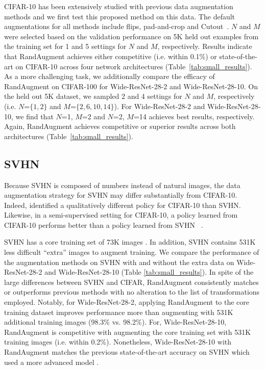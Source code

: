 CIFAR-10 has been extensively studied with previous data augmentation methods and we first test this proposed method on this data. The default augmentations for all methods include flips, pad-and-crop and Cutout~\cite{cutout2017}. $N$ and $M$ were selected based on the validation performance on 5K held out examples from the training set for 1 and 5 settings for $N$ and $M$, respectively. Results indicate that RandAugment achieves either competitive (i.e. within 0.1\%) or state-of-the-art on CIFAR-10 across four network architectures (Table~\ref{tab:small_results}). As a more challenging task, we additionally compare the efficacy of RandAugment on CIFAR-100 for Wide-ResNet-28-2 and Wide-ResNet-28-10. On the held out 5K dataset, we sampled 2 and 4 settings for $N$ and $M$, respectively (i.e. 
$N$=$\{1,2\}$ and $M$=$\{2, 6, 10, 14\}$). For Wide-ResNet-28-2 and Wide-ResNet-28-10, we find that $N$=1, $M$=2 and $N$=2, $M$=14 achieves best results, respectively.
Again, RandAugment achieves competitive or superior results across both architectures (Table~\ref{tab:small_results}).

\subsection{SVHN}

Because SVHN is composed of numbers instead of natural images, the data augmentation strategy for SVHN may differ substantially from CIFAR-10.
Indeed, \cite{cubuk2018autoaugment} identified a qualitatively different policy for CIFAR-10 than SVHN. Likewise, in a semi-supervised setting for CIFAR-10, a policy learned from CIFAR-10 performs better than a policy learned from SVHN ~\cite{xie2019unsupervised}.

SVHN has a core training set of 73K images \cite{netzer2011reading}. In addition, SVHN contains 531K less difficult ``extra'' images to augment training.
We compare the performance of the augmentation methods on SVHN with and without the extra data on Wide-ResNet-28-2 and Wide-ResNet-28-10 (Table \ref{tab:small_results}). In spite of the large differences between SVHN and CIFAR, RandAugment consistently matches or outperforms previous methods with no alteration to the list of transformations employed. Notably, for Wide-ResNet-28-2, applying RandAugment to the core training dataset improves performance more than augmenting with 531K additional training images (98.3\% vs. 98.2\%). For, Wide-ResNet-28-10, RandAugment is competitive with augmenting the core training set with 531K training images (i.e. within 0.2\%). Nonetheless, Wide-ResNet-28-10 with RandAugment matches the previous state-of-the-art accuracy on SVHN which used a more advanced model \cite{cubuk2018autoaugment}.

